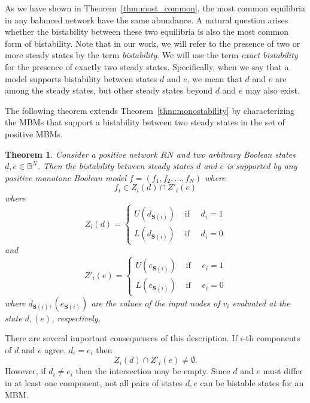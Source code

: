 \documentclass[10pt,letterpaper]{article}
\newcommand{\bbB}{\mathbb{B}}
\newcommand{\Sources}{\mathbf{S}}
\newtheorem{thm}{Theorem}[section]
\begin{document}
As we have shown in Theorem~\ref{thm:most_common}, the most common equilibria in any balanced network have the same abundance. A natural question arises whether the bistability between these two equilibria is also the most common form of bistability. Note that in our work, we will refer to the presence of two or more steady states by the term \textit{bistability}. We will use the term \textit{exact bistability} for the presence of exactly two steady states. Specifically, when we say that a model supports bistability between states $d$ and $e$, we mean that $d$ and $e$ are among the steady states, but other steady states beyond $d$ and $e$ may also exist.

The following theorem extends Theorem~\ref{thm:monostability} by characterizing the MBMs that support a bistability between two steady states in the set of positive MBMs.

\begin{thm}\label{thm:bistability}
Consider a positive network $RN$ and two arbitrary Boolean states $d,e \in \bbB^N$.
Then the bistability between steady states $d$ and $e$ is supported by any positive monotone Boolean model $f=(f_1,f_2, \ldots, f_N)$ where
\[ f_i \in Z_i(d)\cap Z'_i(e) \]
where 
\[ Z_i(d)= \left\{ \begin{array}{cc}
U(d_{\Sources(i)}) & \mbox{ if } \quad d_i=1\\
L(d_{\Sources(i)}) &\mbox{ if } \quad d_i=0
\end{array}
\right .
\]
and 
\[ Z'_i(e)= \left\{ \begin{array}{cc}
U(e_{\Sources(i)}) & \mbox{ if } \quad e_i=1\\
L(e_{\Sources(i)}) &\mbox{ if } \quad e_i=0
\end{array}
\right .
\]
where $d_{\Sources(i)}, (e_{\Sources(i)})$ are the values of the input nodes of $v_i$ evaluated at the state $d, (e)$, respectively.
\end{thm}


There are several important consequences of this description. 
If $i$-th components of $d$ and $e$ agree, $d_i=e_i$ then 
\[ Z_i(d) \cap Z'_i(e) \not = \emptyset.\]
However, if $d_i\not =e_i$ then the intersection may be empty. Since $d$ and $e$ must differ in at least one component, not all pairs of states $d,e$ can be bistable states for an MBM.
\end{document}
